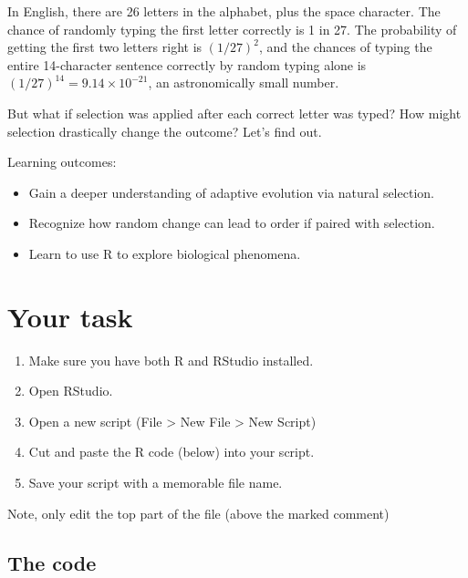 \documentclass[
  a4paper]{book}
\providecommand{\tightlist}{%
  \setlength{\itemsep}{0pt}\setlength{\parskip}{0pt}}
\begin{document}
In English, there are 26 letters in the alphabet, plus the space character. The chance of randomly typing the first letter correctly is 1 in 27. The probability of getting the first two letters right is \((1/27)^2\), and the chances of typing the entire 14-character sentence correctly by random typing alone is \((1/27)^{14} = 9.14 \times 10^{-21}\), an astronomically small number.

But what if selection was applied after each correct letter was typed? How might selection drastically change the outcome? Let's find out.

\begin{do-something}
Learning outcomes:

\begin{itemize}
\tightlist
\item
  Gain a deeper understanding of adaptive evolution via natural
  selection.
\item
  Recognize how random change can lead to order if paired with
  selection.
\item
  Learn to use R to explore biological phenomena.
\end{itemize}
\end{do-something}

\section{Your task}\label{your-task}

\begin{enumerate}
\def\labelenumi{\arabic{enumi}.}
\setcounter{enumi}{-1}
\tightlist
\item
  Make sure you have both R and RStudio installed.
\item
  Open RStudio.
\item
  Open a new script (File \textgreater{} New File \textgreater{} New Script)
\item
  Cut and paste the R code (below) into your script.
\item
  Save your script with a memorable file name.
\end{enumerate}

Note, only edit the top part of the file (above the marked comment)

\subsection{The code}\label{the-code}
\end{document}
